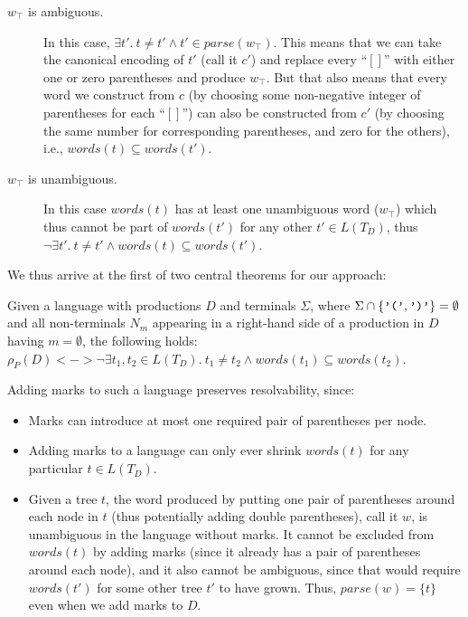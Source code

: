 \documentclass[runningheads]{llncs}
\newcommand{\T}{\Sigma} %
\newcommand{\parse}{\mathit{parse}} %
\newcommand{\words}{\mathit{words}} %
\begin{document}
\begin{description}
  \item[$w_\top$ is ambiguous.] In this case, $\exists t'.\ t \neq t' \land t' \in \parse(w_\top)$. This means that we can take the canonical encoding of $t'$ (call it $c'$) and replace every ``$[]$'' with either one or zero parentheses and produce $w_\top$. But that also means that every word we construct from $c$ (by choosing some non-negative integer of parentheses for each ``$[]$'') can also be constructed from $c'$ (by choosing the same number for corresponding parentheses, and zero for the others), i.e., $\words(t) \subseteq \words(t')$.
  \item[$w_\top$ is unambiguous.] In this case $\words(t)$ has at least one unambiguous word ($w_\top$) which thus cannot be part of $\words(t')$ for any other $t' \in L(T_D)$, thus $\neg \exists t'.\ t \neq t' \land \words(t) \subseteq \words(t')$.
\end{description}

\noindent We thus arrive at the first of two central theorems for our approach:

\begin{theorem}
  Given a language with productions $D$ and terminals $\T$, where $\T \cap \{\verb|'('|, \verb|')'|\} = \emptyset$ and all non-terminals $N_m$ appearing in a right-hand side of a production in $D$ having $m = \emptyset$, the following holds: $\rho_P(D) <-> \neg \exists t_1, t_2 \in L(T_D).\ t_1 \neq t_2 \land \words(t_1) \subseteq \words(t_2)$.
\end{theorem}

Adding marks to such a language preserves resolvability, since:

\begin{itemize}
  \item Marks can introduce at most one required pair of parentheses per node.
  \item Adding marks to a language can only ever shrink $\words(t)$ for any particular $t \in L(T_D)$.
  \item Given a tree $t$, the word produced by putting one pair of parentheses around each node in $t$ (thus potentially adding double parentheses), call it $w$, is unambiguous in the language without marks. It cannot be excluded from $\words(t)$ by adding marks (since it already has a pair of parentheses around each node), and it also cannot be ambiguous, since that would require $\words(t')$ for some other tree $t'$ to have grown. Thus, $\parse(w) = \{t\}$ even when we add marks to $D$.
\end{itemize}
\end{document}
